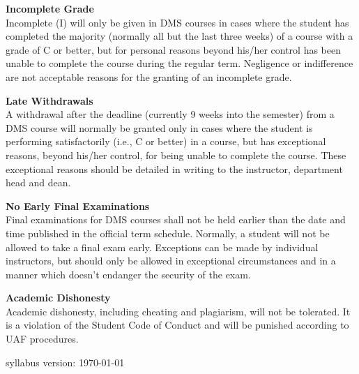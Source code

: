 \documentclass[12pt]{article}
\renewcommand{\emph}[1]{\textsf{\textbf{#1}}}
\newcommand{\localhead}[1]{\par\smallskip\textbf{#1}\nobreak\\}%
\def\subheading#1{\localhead{\emph{#1}}}
\begin{document}
\subheading{Incomplete Grade} 
Incomplete (I) will only be given in
  DMS courses in cases where
  the student has completed the majority (normally all but the last
  three weeks) of a course with a grade of C or better, but for
  personal reasons beyond his/her control has been unable to complete
  the course during the regular term. Negligence or indifference are
  not acceptable reasons for the granting of an incomplete
  grade. 

\subheading{Late Withdrawals} 
A withdrawal after the deadline
  (currently 9 weeks into the semester) from a DMS course will
  normally be granted only in cases where the student is performing
  satisfactorily (i.e., C or better) in a course, but has exceptional
  reasons, beyond his/her control, for being unable to complete the
  course. These exceptional reasons should be detailed in writing to
  the instructor, department head and dean.

\subheading{No Early Final Examinations}
Final examinations for DMS
  courses shall not be held earlier than the date and time published
  in the official term schedule. Normally, a student will not be
  allowed to take a final exam early. Exceptions can be made by
  individual instructors, but should only be allowed in exceptional
  circumstances and in a manner which doesn't endanger the security of
  the exam.

\subheading{Academic Dishonesty}
Academic dishonesty, including cheating and plagiarism, will not
be tolerated.  It is a violation of the Student Code of Conduct
and will be punished according to UAF procedures.

\vfill
\hfill \scriptsize syllabus version: \today \normalsize
\end{document}
